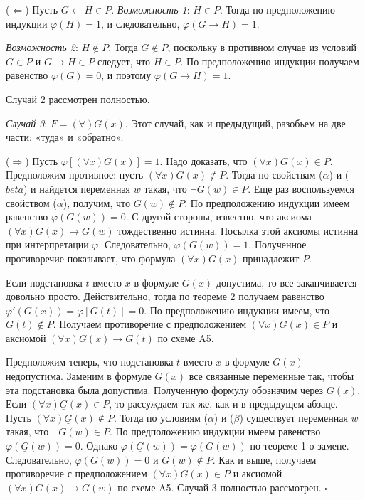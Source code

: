\documentclass[a4paper]{article}
\begin{document}
($\Leftarrow$) Пусть $G \leftarrow H \in P$.
\textit{Возможность 1}: $H \in P$. Тогда по предположению индукции $\varphi (H) = 1$, и следовательно, $\varphi(G \rightarrow H) = 1$.

\textit{Возможность 2}: $H \notin P$. Тогда $G \notin P$, поскольку в противном случае из условий $G \in P$ и $G \rightarrow H \in P$ следует, что $H \in P$. По предположению индукции получаем равенство $\varphi(G) = 0$, и поэтому $\varphi(G \rightarrow H) = 1$.

Случай 2 рассмотрен полностью.

\textit{Случай 3}: $F = (\forall)G(x)$. Этот случай, как и предыдущий, разобьем на две части: «туда» и «обратно».

($\Rightarrow$) Пусть $\varphi[(\forall x)G(x)] = 1$. Надо доказать, что $(\forall x)G(x) \in P$.
Предположим противное: пусть $(\forall x)G(x) \notin P$. Тогда по свойствам ($\alpha$) и ($beta$) и найдется переменная $w$ такая, что $\neg G(w) \in P$. Еще раз воспользуемся свойством ($\alpha$), получим, что $G(w) \notin P$. По предположению индукции имеем равенство $\varphi(G(w)) = 0$. С другой стороны, известно, что аксиома $(\forall x)G(x) \rightarrow G(w)$ тождественно истинна. Посылка этой аксиомы истинна при интерпретации $\varphi$. Следовательно, $\varphi(G(w)) = 1$. Полученное противоречие показывает, что формула $(\forall x)G(x)$ принадлежит $P$.


Если подстановка $t$ вместо $x$ в формуле $G(x)$ допустима, то все заканчивается довольно просто. Действительно, тогда по теореме 2 получаем равенство $\varphi'(G(x)) = \varphi[G(t)] = 0$. По предположению индукции имеем, что $G(t) \notin P$. Получаем противоречие с предположением $(\forall x)G(x) \in P$ и аксиомой $(\forall x)G(x) \rightarrow G(t)$ по схеме A5.

Предположим теперь, что подстановка $t$ вместо $x$ в формуле $G(x)$ недопустима. Заменим в формуле $G(x)$ все связанные переменные так, чтобы эта подстановка была допустима. Полученную формулу обозначим через $\underline{G}(x)$. Если $(\forall x)\underline{G}(x) \in P$, то рассуждаем так же, как и в предыдущем абзаце. Пусть $(\forall x)\underline{G}(x) \notin P$. Тогда по условиям ($\alpha$) и ($\beta$) существует переменная $w$ такая, что $\neg \underline{G}(w) \in P$. По предположению индукции имеем равенство $\varphi (\underline{G}(w)) = 0$. Однако $\varphi (\underline{G}(w)) = \varphi (G(w))$ по теореме 1 о замене. Следовательно, $\varphi (G(w)) = 0$ и $G(w) \notin P$. Как и выше, получаем противоречие с предположением $(\forall x)G(x) \in P$ и аксиомой $(\forall x)G(x) \rightarrow G(w)$ по схеме A5. Случай 3 полностью рассмотрен. $\square$
\end{document}
